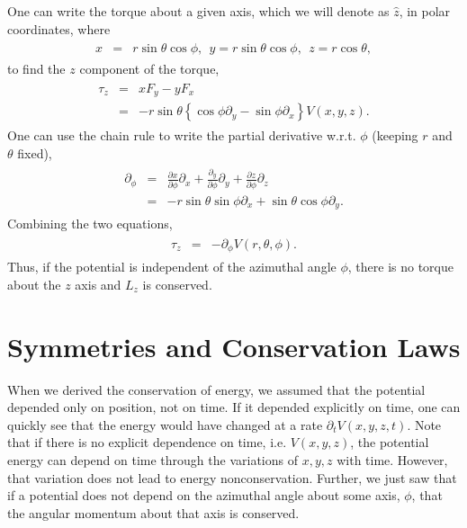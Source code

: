 \documentclass[letterpaper,10pt,english]{sphinxmanual}
\begin{document}
One can write the torque about a given axis, which we will denote as \(\hat{z}\), in polar coordinates, where
\begin{equation*}
\begin{split}
\begin{eqnarray}
x&=&r\sin\theta\cos\phi,~~y=r\sin\theta\cos\phi,~~z=r\cos\theta,
\end{eqnarray}
\end{split}
\end{equation*}
to find the \(z\) component of the torque,
\begin{equation*}
\begin{split}
\begin{eqnarray}
\tau_z&=&xF_y-yF_x\\
\nonumber
&=&-r\sin\theta\left\{\cos\phi \partial_y-\sin\phi \partial_x\right\}V(x,y,z).
\end{eqnarray}
\end{split}
\end{equation*}
One can use the chain rule to write the partial derivative w.r.t. \(\phi\) (keeping \(r\) and \(\theta\) fixed),
\begin{equation*}
\begin{split}
\begin{eqnarray}
\partial_\phi&=&\frac{\partial x}{\partial\phi}\partial_x+\frac{\partial_y}{\partial\phi}\partial_y
+\frac{\partial z}{\partial\phi}\partial_z\\
\nonumber
&=&-r\sin\theta\sin\phi\partial_x+\sin\theta\cos\phi\partial_y.
\end{eqnarray}
\end{split}
\end{equation*}
Combining the two equations,
\begin{equation*}
\begin{split}
\begin{eqnarray}
\tau_z&=&-\partial_\phi V(r,\theta,\phi).
\end{eqnarray}
\end{split}
\end{equation*}
Thus, if the potential is independent of the azimuthal angle \(\phi\),
there is no torque about the \(z\) axis and \(L_z\) is conserved.


\section{Symmetries and Conservation Laws}
\label{\detokenize{chapter1:symmetries-and-conservation-laws}}
When we derived the conservation of energy, we assumed that the
potential depended only on position, not on time. If it depended
explicitly on time, one can quickly see that the energy would have
changed at a rate \(\partial_tV(x,y,z,t)\). Note that if there is no
explicit dependence on time, i.e. \(V(x,y,z)\), the potential energy can
depend on time through the variations of \(x,y,z\) with time. However,
that variation does not lead to energy non\sphinxhyphen{}conservation. Further, we
just saw that if a potential does not depend on the azimuthal angle
about some axis, \(\phi\), that the angular momentum about that axis is
conserved.
\end{document}
